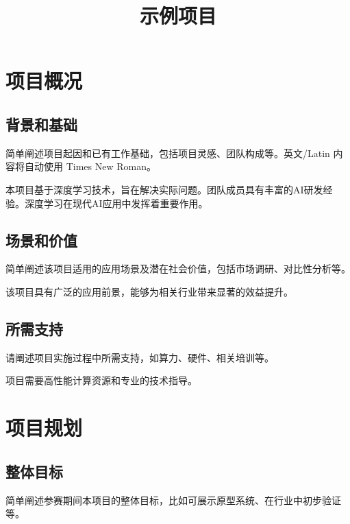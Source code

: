 \documentclass{cpipc}
\title{示例项目}
\begin{document}
\maketitle

\makemycontents

\changehistory

\startmain

\section{项目概况}

\subsection{背景和基础}

简单阐述项目起因和已有工作基础，包括项目灵感、团队构成等。英文/Latin 内容将自动使用 Times New Roman。

本项目基于深度学习技术\cite{goodfellow2016deep}，旨在解决实际问题。团队成员具有丰富的AI研发经验。深度学习在现代AI应用中发挥着重要作用\cite{lecun2015deep}。

\subsection{场景和价值}

简单阐述该项目适用的应用场景及潜在社会价值，包括市场调研、对比性分析等。

该项目具有广泛的应用前景，能够为相关行业带来显著的效益提升。

\subsection{所需支持}

请阐述项目实施过程中所需支持，如算力、硬件、相关培训等。

项目需要高性能计算资源和专业的技术指导。

\section{项目规划}
\subsection{整体目标}

简单阐述参赛期间本项目的整体目标，比如可展示原型系统、在行业中初步验证等。
\end{document}
